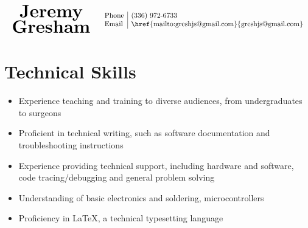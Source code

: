 \documentclass[10pt]{article}
\begin{document}
\begin{center}
  \[
\begin{array}{lr}
\begin{array}{cr}
\mbox{\bf\Huge Jeremy} \\
\mbox{\bf\Huge Gresham}
\end{array} &
\begin{array}{l|l}
\setlength{\arraycolsep}{1pt}
\mbox{Phone} & $(336) 972-6733$ \\
\mbox{Email} & $\href{mailto:greshjs@gmail.com}{greshjs@gmail.com}$ \\
\end{array}
\end{array}
\]

\end{center}


\section*{Technical Skills}

\begin{itemize}\raggedright
\setlength{\itemsep}{0pt}
\item Experience teaching and training to diverse audiences, from undergraduates to surgeons

\item Proficient in technical writing, such as software documentation and troubleshooting instructions

\item Experience providing technical support, including hardware and software, code tracing/debugging and general problem solving

\item Understanding of basic electronics and soldering, microcontrollers

\item Proficiency in {\rmfamily \LaTeX}, a technical typesetting language
  
\end{itemize}
\end{document}
